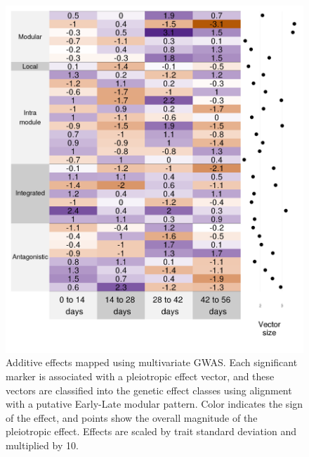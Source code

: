 \begin{refsection}
\begin{figure}
    \centering
    \includegraphics[width=\linewidth]{chapter_atchley/media/additive_effects_points.png}
    \caption[QTL effect classification]{Additive effects mapped using multivariate GWAS. 
    Each significant marker is associated with a pleiotropic effect vector, and these vectors 
    are classified into the genetic effect classes using alignment with a putative Early-Late 
    modular pattern. Color indicates the sign of the effect, and points show the overall magnitude 
    of the pleiotropic effect. Effects are scaled by trait standard deviation and multiplied by 10.}
    \label{additive_effects_vectors}
\end{figure}


\end{refsection}
